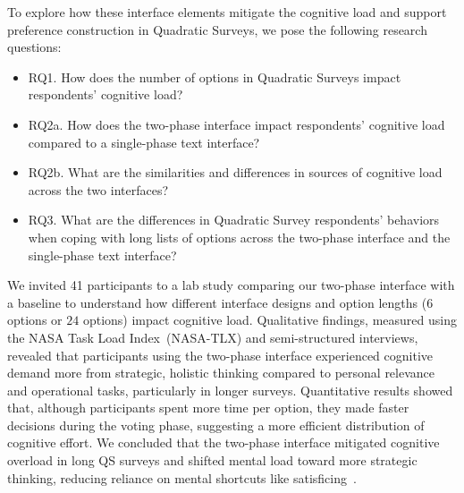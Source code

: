 To explore how these interface elements mitigate the cognitive load and support preference construction in Quadratic Surveys, we pose the following research questions:
\begin{itemize}
    \item RQ1. How does the number of options in Quadratic Surveys impact respondents' cognitive load?
    \item RQ2a. How does the two-phase interface impact respondents' cognitive load compared to a single-phase text interface?
    \item RQ2b. What are the similarities and differences in sources of cognitive load across the two interfaces?
    \item RQ3. What are the differences in Quadratic Survey respondents' behaviors when coping with long lists of options across the two-phase interface and the single-phase text interface?
\end{itemize}

We invited 41 participants to a lab study comparing our two-phase interface with a baseline to understand how different interface designs and option lengths ($6$ options or $24$ options) impact cognitive load. Qualitative findings, measured using the NASA Task Load Index~(NASA-TLX) and semi-structured interviews, revealed that participants using the two-phase interface experienced cognitive demand more from strategic, holistic thinking compared to personal relevance and operational tasks, particularly in longer surveys. Quantitative results showed that, although participants spent more time per option, they made faster decisions during the voting phase, suggesting a more efficient distribution of cognitive effort. We concluded that the two-phase interface mitigated cognitive overload in long QS surveys and shifted mental load toward more strategic thinking, reducing reliance on mental shortcuts like satisficing~\cite{simonBehavioralModelRational1955}.


